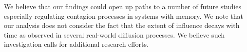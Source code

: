 We believe that our findings could open up paths to a number of future studies especially regulating contagion processes in systems with memory. 
We note that our analysis does not 
consider the fact that the extent of influence decays with time as observed in several real-world diffusion processes. We believe such 
investigation calls for additional research efforts.
\fi

\medskip
